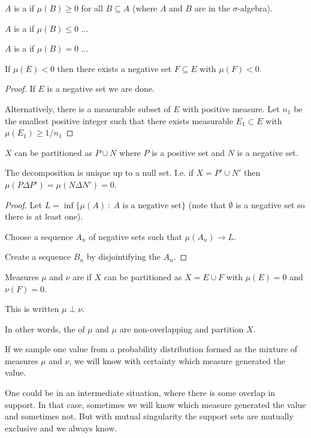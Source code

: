 \begin{definition}
  $A$ is a  if $\mu(B) \geq 0$ for all $B \subseteq A$ (where $A$ and $B$ are in the $\sigma$-algebra).

  $A$ is a  if $\mu(B) \leq 0$ ...

  $A$ is a  if $\mu(B) = 0$ ...
\end{definition}

\begin{theorem}
  If $\mu(E) < 0$ then there exists a negative set $F \subseteq E$ with $\mu(F) < 0$.
\end{theorem}

\begin{proof}
  If $E$ is a negative set we are done.


  Alternatively, there is a measurable subset of $E$ with positive measure. Let $n_1$ be the smallest positive
  integer such that there exists measurable $E_1 \subset E$ with $\mu(E_1) \geq 1/n_1$
\end{proof}

\begin{theorem}
  $X$ can be partitioned as $P \cup N$ where $P$ is a positive set and $N$ is a negative set.

  The decomposition is unique up to a null set. I.e. if $X = P' \cup N'$
  then $\mu(P \Delta P') = \mu(N \Delta N') = 0$.
\end{theorem}

\begin{proof}

  Let $L = \inf \{\mu(A) ~:~ A \text{~is a negative set}\}$ (note that $\emptyset$ is a negative set so there is at least one).

  Choose a sequence $A_n$ of negative sets such that $\mu(A_n) \to L$.

  Create a sequence $B_n$ by disjointifying the $A_n$.

\end{proof}

\begin{definition}
  Measures $\mu$ and $\nu$ are  if $X$ can be partitioned as $X = E \cup F$ with
  $\mu(E) = 0$ and $\nu(F) = 0$.

  This is written $\mu \perp \nu$.
\end{definition}

\begin{intuition*}
  In other words, the  of $\mu$ and $\mu$ are non-overlapping and partition $X$.

  If we sample one value from a probability distribution formed as the mixture of measures $\mu$ and $\nu$, we
  will know with certainty which measure generated the value.

  One could be in an intermediate situation, where there is some overlap in support. In that case,
  sometimes we will know which measure generated the value and sometimes not. But with mutual
  singularity the support sets are mutually exclusive and we always know.
\end{intuition*}

